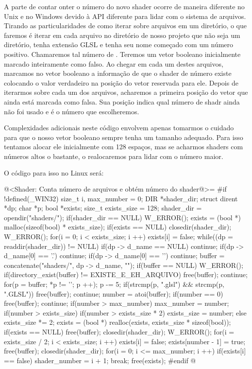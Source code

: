 {A parte de contar onter o número do novo shader ocorre de maneira
diferente no Unix e no Windows devido à API diferente para lidar com o
sistema de arquivos. Tirando as particularidades de como iterar sobre
arquivos em um diretório, o que faremos é iterar em cada arquivo no
diretório  de nosso projeto que não seja um
diretório, tenha extensão GLSL e tenha seu nome começado com um número
positivo. Chamaremos tal número de . Teremos um
vetor booleano inicialmente marcado inteiramente como falso. Ao chegar
em cada um destes arquivos, marcamos no vetor booleano a informação de
que o shader de número  existe colocando o valor
verdadeiro na posição do vetor reservada para ele. Depois de iterarmos
sobre cada um dos arquivos, acharemos a primeira posição do vetor que
ainda está marcada como falsa. Sua posição indica qual número de shadr
ainda não foi usado e é o número que escolheremos.

Complexidades adicionais neste código envolvem apenas tomarmos o
cuidado para que o nosso vetor booleano sempre tenha um tamanho
adequado. Para isso tentamos alocar ele inicialmente com 128 espaços,
mas se acharmos shaders com números altos o bastante, o realocaremos
para lidar com o número maior.

O código para isso no Linux será:

\iniciocodigo
@<Shader: Conta número de arquivos e obtém número do shader@>=
#if !defined(_WIN32)
{
  size_t i, max_number = 0;
  DIR *shader_dir;
  struct dirent *dp;
  char *p;
  bool *exists;
  size_t exists_size = 128;
  shader_dir = opendir("shaders/");
  if(shader_dir == NULL)
    W_ERROR();
  exists = (bool *) malloc(sizeof(bool) * exists_size);
  if(exists == NULL){
    closedir(shader_dir);
    W_ERROR();
  }
  for(i = 0; i < exists_size; i ++)
    exists[i] = false;
  while((dp = readdir(shader_dir)) != NULL){
    if(dp -> d_name == NULL) continue;
    if(dp -> d_name[0] == '.') continue;
    if(dp -> d_name[0] == '\0') continue;
    buffer = concatenate("shaders/", dp -> d_name, "");
    if(buffer == NULL) W_ERROR();
    if(directory_exist(buffer) != EXISTE_E_EH_ARQUIVO){
      free(buffer);
      continue;
    }
    for(p = buffer; *p != '\0'; p ++);
    p -= 5;
    if(strcmp(p, ".glsl") && strcmp(p, ".GLSL")){
      free(buffer);
      continue;
    }
    number = atoi(buffer);
    if(number == 0){
      free(buffer);
      continue;
    }
    if(number > max_number)
      max_number = number;
    if(number > exists_size){
      if(number > exists_size * 2)
        exists_size = number;
      else
        exists_size *= 2;
      exists = (bool *) realloc(exists, exists_size * sizeof(bool));
      if(exists == NULL){
        free(buffer);
        closedir(shader_dir);
        W_ERROR();
      }
      for(i = exists_size / 2; i < exists_size; i ++)
        exists[i] = false;
    }
    exists[number - 1] = true;
    free(buffer);
  }
  closedir(shader_dir);
  for(i = 0; i <= max_number; i ++)
    if(exists[i] == false){
      shader_number = i + 1;
      break;
    }
  free(exists);
}
#endif
@
\fimcodigo

}
